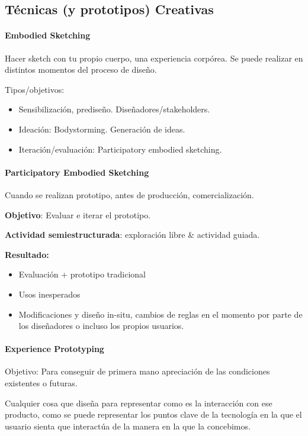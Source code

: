 \documentclass[12pt]{report} %
\begin{document}
\subsection{Técnicas (y prototipos) Creativas}
\paragraph{Embodied Sketching}
Hacer sketch con tu propio cuerpo, una experiencia corpórea. Se puede realizar en distintos momentos del proceso de diseño.

Tipos/objetivos:
\begin{itemize}
  \item Sensibilización, prediseño. Diseñadores/stakeholders.
  \item Ideación: Bodystorming. Generación de ideas.
  \item Iteración/evaluación: Participatory embodied sketching.
\end{itemize}

\paragraph{Participatory Embodied Sketching}
Cuando se realizan prototipo, antes de producción, comercialización.

\textbf{Objetivo}: Evaluar e iterar el prototipo.

\textbf{Actividad semiestructurada}: exploración libre \& actividad guiada.

\textbf{Resultado:}
\begin{itemize}
  \item Evaluación + prototipo tradicional
  \item Usos inesperados
  \item Modificaciones y diseño in-situ, cambios de reglas en el momento por parte de los diseñadores o incluso los propios usuarios.
\end{itemize}
  
\paragraph{Experience Prototyping}  
Objetivo: Para conseguir de primera mano apreciación de las condiciones existentes o futuras.

Cualquier cosa que diseña para representar como es la interacción con ese producto, como se puede representar los puntos clave de la tecnología en la que el usuario sienta que interactúa de la manera en la que la concebimos.
\end{document}
